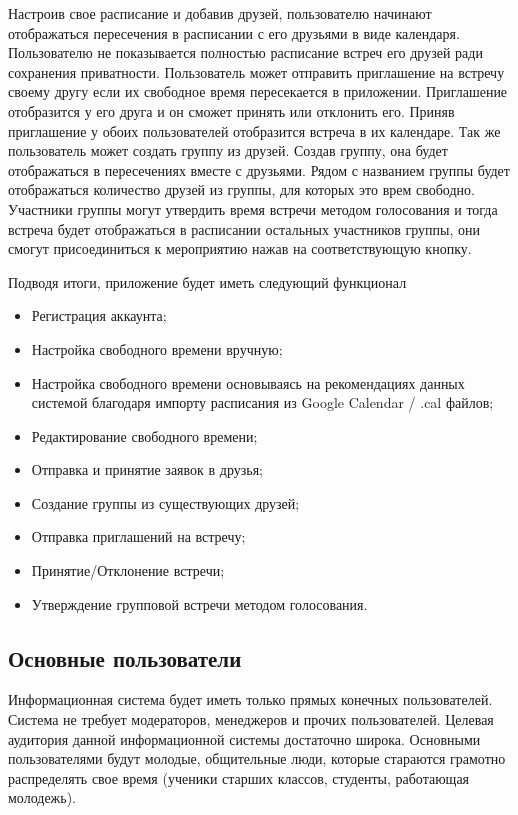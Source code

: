 \documentclass[14pt]{extreport}
\begin{document}
        Настроив свое расписание и добавив друзей, пользователю начинают отображаться пересечения в расписании с его друзьями в виде календаря. Пользователю не показывается полностью расписание встреч его друзей ради сохранения приватности. Пользователь может отправить приглашение на встречу своему другу если их свободное время пересекается в приложении. Приглашение отобразится у его друга и он сможет принять или отклонить его. Приняв приглашение у обоих пользователей отобразится встреча в их календаре. Так же пользователь может создать группу из друзей. Создав группу, она будет отображаться в пересечениях вместе с друзьями. Рядом с названием группы будет отображаться количество друзей из группы, для которых это врем свободно. Участники группы могут утвердить время встречи методом голосования и тогда встреча будет отображаться в расписании остальных участников группы, они смогут присоединиться к мероприятию нажав на соответствующую кнопку.

        Подводя итоги, приложение будет иметь следующий функционал 
        \begin{itemize}
            \item Регистрация аккаунта;
            \item Настройка свободного времени вручную;
            \item Настройка свободного времени основываясь на рекомендациях данных системой благодаря импорту расписания из Google Calendar / .cal файлов;
            \item Редактирование свободного времени;
            \item Отправка и принятие заявок в друзья;
            \item Создание группы из существующих друзей;
            \item Отправка приглашений на встречу;
            \item Принятие/Отклонение встречи;
            \item Утверждение групповой встречи методом голосования.
        \end{itemize}
        \subsection{Основные пользователи  }

        Информационная система будет иметь только прямых конечных пользователей. Система не требует модераторов, менеджеров и прочих пользователей.
        Целевая аудитория данной информационной системы достаточно широка. Основными пользователями будут молодые, общительные люди, которые стараются грамотно распределять свое время (ученики старших классов, студенты, работающая молодежь).
\end{document}
